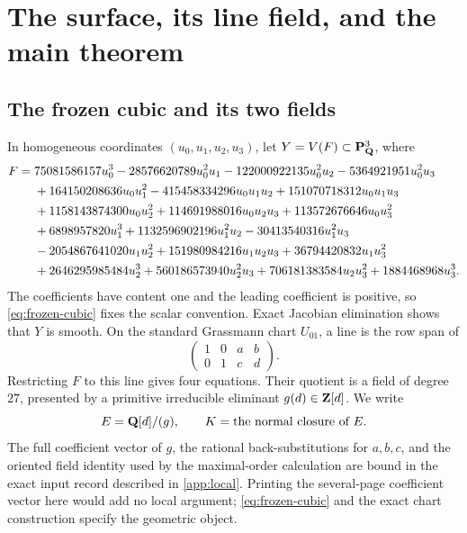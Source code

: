 \section{The surface, its line field, and the main theorem}
\label{sec:setup-theorem}

\subsection{The frozen cubic and its two fields}

In homogeneous coordinates $(u_0,u_1,u_2,u_3)$, let
$Y=V(F)\subset\mathbf{P}^3_{\mathbf{Q}}$, where
\begin{align}
F={}&75081586157u_0^3-28576620789u_0^2u_1
-122000922135u_0^2u_2-5364921951u_0^2u_3\notag\\
&+164150208636u_0u_1^2-415458334296u_0u_1u_2
+151070718312u_0u_1u_3\notag\\
&+1158143874300u_0u_2^2+114691988016u_0u_2u_3
+113572676646u_0u_3^2\notag\\
&+6898957820u_1^3+1132596902196u_1^2u_2
-30413540316u_1^2u_3\notag\\
&-2054867641020u_1u_2^2+151980984216u_1u_2u_3
+36794420832u_1u_3^2\notag\\
&+2646295985484u_2^3+560186573940u_2^2u_3
+706181383584u_2u_3^2+1884468968u_3^3.
\label{eq:frozen-cubic}
\end{align}
The coefficients have content one and the leading coefficient is positive,
so \cref{eq:frozen-cubic} fixes the scalar convention.  Exact Jacobian
elimination shows that $Y$ is smooth.  On the standard Grassmann chart
$U_{01}$, a line is the row span of
\[
 \begin{pmatrix}1&0&a&b\\0&1&c&d\end{pmatrix}.
\]
Restricting $F$ to this line gives four equations.  Their quotient is a field
of degree $27$, presented by a primitive irreducible eliminant
$g(d)\in\mathbf{Z}[d]$.  We write
\[
 E=\mathbf{Q}[d]/(g),\qquad K=\text{the normal closure of }E.
\]
The full coefficient vector of $g$, the rational back-substitutions for
$a,b,c$, and the oriented field identity used by the maximal-order
calculation are bound in the exact input record described in
\cref{app:local}.  Printing the several-page coefficient vector here would
add no local argument; \cref{eq:frozen-cubic} and the exact chart
construction specify the geometric object.

